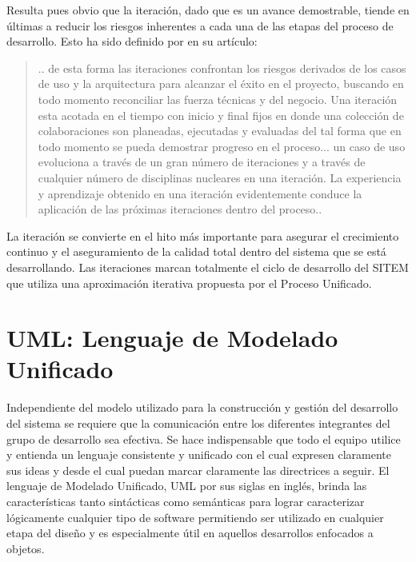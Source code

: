 Resulta pues obvio que la iteración, dado que es un avance demostrable, tiende en últimas a reducir los riesgos inherentes a cada una de las etapas del proceso de desarrollo. Esto ha sido definido por \cite{alhir2003} en su artículo:
\begin{quote}
.. de esta forma las iteraciones confrontan los riesgos derivados de los casos de uso y la arquitectura para alcanzar el éxito en el proyecto, buscando en todo momento reconciliar las fuerza técnicas y del negocio. Una iteración esta acotada en el tiempo con inicio y final fijos en donde una colección de colaboraciones son planeadas, ejecutadas y evaluadas del tal forma que en todo momento se pueda demostrar progreso en el proceso... un caso de uso evoluciona a través de un gran número de iteraciones y a través de cualquier número de disciplinas nucleares en una iteración. La experiencia y aprendizaje obtenido en una iteración evidentemente conduce la aplicación de las próximas iteraciones dentro del proceso..\end{quote} 

La iteración se convierte en el hito más importante para asegurar el crecimiento continuo y el aseguramiento de la calidad total dentro del sistema que se está desarrollando. Las iteraciones marcan totalmente el ciclo de desarrollo del SITEM que utiliza una aproximación iterativa propuesta por el Proceso Unificado.

\section{UML: Lenguaje de Modelado Unificado}

Independiente del modelo utilizado para la construcción y gestión del desarrollo del sistema se requiere que la comunicación entre los diferentes integrantes del grupo de desarrollo sea efectiva. Se hace indispensable que todo el equipo utilice y entienda un lenguaje consistente y unificado con el cual expresen claramente sus ideas y desde el cual puedan marcar claramente las directrices a seguir. El lenguaje de Modelado Unificado, UML por sus siglas en inglés, brinda las características tanto sintácticas como semánticas para lograr caracterizar lógicamente cualquier tipo de software permitiendo ser utilizado en cualquier etapa del diseño y es especialmente útil en aquellos desarrollos enfocados a objetos.

